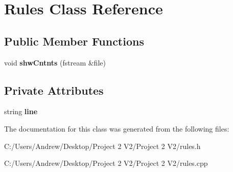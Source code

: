 \hypertarget{class_rules}{}\section{Rules Class Reference}
\label{class_rules}
\subsection*{Public Member Functions}
\begin{DoxyCompactItemize}
\item 
\mbox{\label{class_rules_a1c81df7f15aa63713f7b7b1ddff802d7}} 
void {\bfseries shw\+Cntnts} (fstream \&file)
\end{DoxyCompactItemize}
\subsection*{Private Attributes}
\begin{DoxyCompactItemize}
\item 
\mbox{\label{class_rules_a4139c3a5420a8ecccd5b9caafc1d77a4}} 
string {\bfseries line}
\end{DoxyCompactItemize}


The documentation for this class was generated from the following files\+:\begin{DoxyCompactItemize}
\item 
C\+:/\+Users/\+Andrew/\+Desktop/\+Project 2 V2/\+Project 2 V2/rules.\+h\item 
C\+:/\+Users/\+Andrew/\+Desktop/\+Project 2 V2/\+Project 2 V2/rules.\+cpp\end{DoxyCompactItemize}
